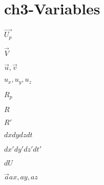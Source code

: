 \section{ch3-Variables}

\noindent $\vec{U_p}$ \newline

\noindent $\vec{V}$ \newline

\noindent $\vec{u}, \vec{v}$ \newline

\noindent $u_x, u_y, u_z$ \newline

\noindent $R_p$ \newline

\noindent $R$  \newline

\noindent $R'$ \newline

\noindent $dx dy dz dt$ \newline

\noindent $dx' dy' dz' dt'$ \newline

\noindent $dU$ \newline

\noindent $\vec{a} ax, ay, az$ \newline